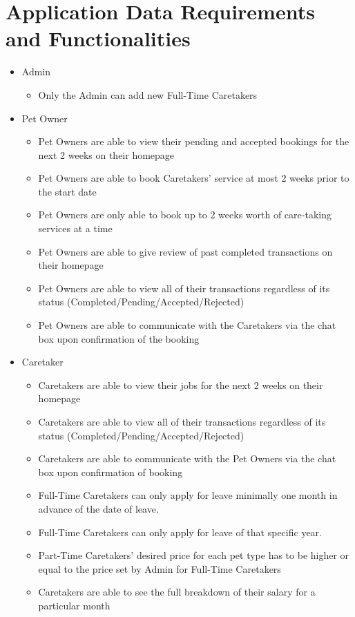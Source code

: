 \documentclass[10pt]{article}
\begin{document}
\section{Application Data Requirements and Functionalities}
\begin{itemize}
    \item Admin
    \begin{itemize}
        \item Only the Admin can add new Full-Time Caretakers
    \end{itemize}
    
    \item Pet Owner
    \begin{itemize}
        \item Pet Owners are able to view their pending and accepted bookings for the next 2 weeks on their homepage
        \item Pet Owners are able to book Caretakers' service at most 2 weeks prior to the start date
        \item Pet Owners are only able to book up to 2 weeks worth of care-taking services at a time
        \item Pet Owners are able to give review of past completed transactions on their homepage
        \item Pet Owners are able to view all of their transactions regardless of its status \newline (Completed/Pending/Accepted/Rejected)
        \item Pet Owners are able to communicate with the Caretakers via the chat box upon confirmation of the booking
    \end{itemize}
    
    \item Caretaker
    \begin{itemize}
        \item Caretakers are able to view their jobs for the next 2 weeks on their homepage
        \item Caretakers are able to view all of their transactions regardless of its status \newline (Completed/Pending/Accepted/Rejected)
        \item Caretakers are able to communicate with the Pet Owners via the chat box upon confirmation of booking
        \item Full-Time Caretakers can only apply for leave minimally one month in advance of the date of leave.
        \item Full-Time Caretakers can only apply for leave of that specific year.
        \item Part-Time Caretakers' desired price for each pet type has to be higher or equal to the price set by Admin for Full-Time Caretakers
        \item Caretakers are able to see the full breakdown of their salary for a particular month
    \end{itemize}
    

\end{itemize}
\end{document}

